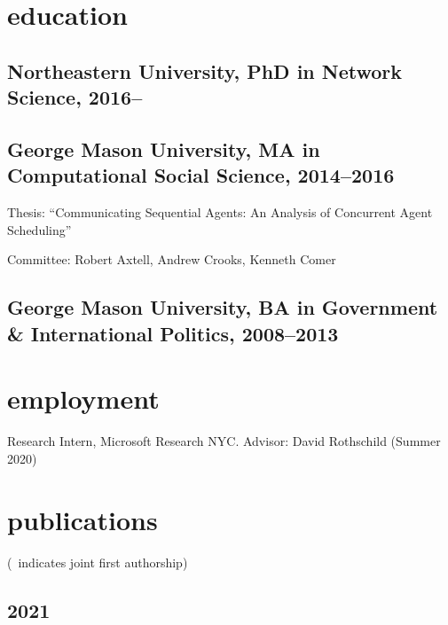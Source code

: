 \documentclass[11pt, letter]{article}
\title{}
\begin{document}
\maketitle

\section{education}
\subsection{Northeastern University, PhD in Network Science, 2016--}
\subsection{George Mason University, MA in Computational Social Science, 2014--2016}
Thesis: ``Communicating Sequential Agents: An Analysis of Concurrent Agent Scheduling''

Committee: Robert Axtell, Andrew Crooks, Kenneth Comer
\subsection{George Mason University, BA in Government \& International Politics, 2008--2013}
\vspace{2mm}
 \section{employment}
 Research Intern, Microsoft Research NYC. Advisor: David Rothschild (Summer 2020)
\vspace{-1mm}

\section{publications}

\vspace{1mm} {\footnotesize (\textdagger\, indicates joint first authorship)}
\subsection*{}
\subsection{2021}
\end{document}
